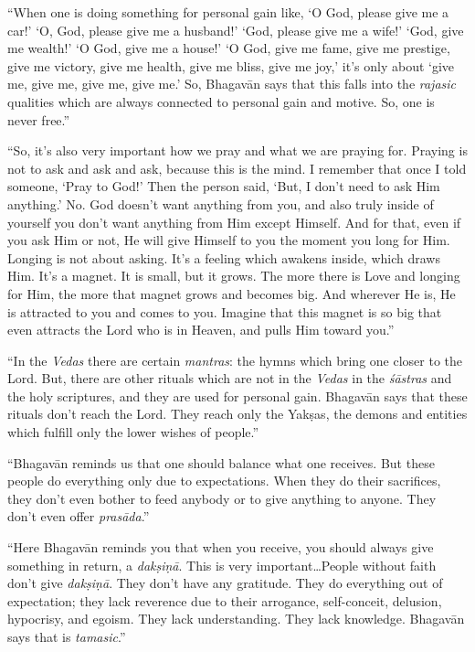 \enquote{When one is doing something for personal gain like, \enquote{O God, please give me a car!} \enquote{O, God, please give me a husband!} \enquote{God, please give me a wife!} \enquote{God, give me wealth!} \enquote{O God, give me a house!} \enquote{O God, give me fame, give me prestige, give me victory, give me health, give me bliss, give me joy,} it’s only about \enquote{give me, give me, give me, give me.} So, Bhagavān says that this falls into the \textit{rajasic} qualities which are always connected to personal gain and motive. So, one is never free.}

\enquote{So, it’s also very important how we pray and what we are praying for. Praying is not to ask and ask and ask, because this is the mind. I remember that once I told someone, \enquote{Pray to God!} Then the person said, \enquote{But, I don’t need to ask Him anything.} No. God doesn’t want anything from you, and also truly inside of yourself you don’t want anything from Him except Himself. And for that, even if you ask Him or not, He will give Himself to you the moment you long for Him. Longing is not about asking. It’s a feeling which awakens inside, which draws Him. It’s a magnet. It is small, but it grows. The more there is Love and longing for Him, the more that magnet grows and becomes big. And wherever He is, He is attracted to you and comes to you. Imagine that this magnet is so big that even attracts the Lord who is in Heaven, and pulls Him toward you.}

\enquote{In the \textit{Vedas} there are certain \textit{mantras}: the hymns which bring one closer to the Lord. But, there are other rituals which are not in the \textit{Vedas} in the \textit{śāstras} and the holy scriptures, and they are used for personal gain. Bhagavān says that these rituals don’t reach the Lord. They reach only the Yakṣas, the demons and entities which fulfill only the lower wishes of people.}

\enquote{Bhagavān reminds us that one should balance what one receives. But these people do everything only due to expectations. When they do their sacrifices, they don’t even bother to feed anybody or to give anything to anyone. They don’t even offer \textit{prasāda}.}

\enquote{Here Bhagavān reminds you that when you receive, you should always give something in return, a \textit{dakṣiṇā}. This is very important\ldots People without faith don’t give \textit{dakṣiṇā}. They don’t have any gratitude. They do everything out of expectation; they lack reverence due to their arrogance, self-conceit, delusion, hypocrisy, and egoism. They lack understanding. They lack knowledge. Bhagavān says that is \textit{tamasic}.}


